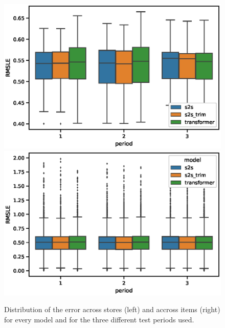 \documentclass{elsarticle}
\begin{document}
	
	    \begin{figure}[h!]
		\centering
		\includegraphics[width=0.48\linewidth]{img/rmsle_storewise}
		\includegraphics[width=0.48\linewidth]{img/rmsle_itemwise}
		\caption{Distribution of the error across stores (left) and accross items (right) for every model  and for the three different test periods used.}
		\label{fig:stores_items_performance}
	\end{figure}

	
	
\end{document}
